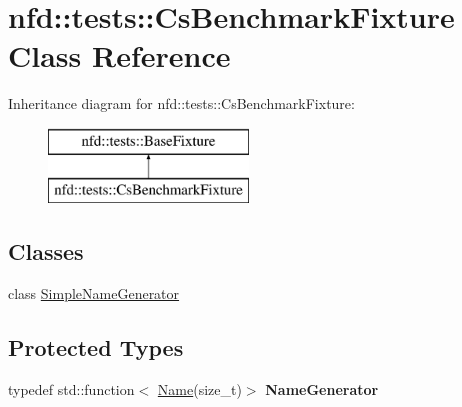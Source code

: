 \hypertarget{classnfd_1_1tests_1_1CsBenchmarkFixture}{}\section{nfd\+:\+:tests\+:\+:Cs\+Benchmark\+Fixture Class Reference}
\label{classnfd_1_1tests_1_1CsBenchmarkFixture}
Inheritance diagram for nfd\+:\+:tests\+:\+:Cs\+Benchmark\+Fixture\+:\begin{figure}[H]
\begin{center}
\leavevmode
\includegraphics[height=2.000000cm]{classnfd_1_1tests_1_1CsBenchmarkFixture}
\end{center}
\end{figure}
\subsection*{Classes}
\begin{DoxyCompactItemize}
\item 
class \hyperlink{classnfd_1_1tests_1_1CsBenchmarkFixture_1_1SimpleNameGenerator}{Simple\+Name\+Generator}
\end{DoxyCompactItemize}
\subsection*{Protected Types}
\begin{DoxyCompactItemize}
\item 
typedef std\+::function$<$ \hyperlink{classndn_1_1Name}{Name}(size\+\_\+t)$>$ {\bfseries Name\+Generator}\hypertarget{classnfd_1_1tests_1_1CsBenchmarkFixture_a0676b638e8150a905d5526db27e60240}{}\label{classnfd_1_1tests_1_1CsBenchmarkFixture_a0676b638e8150a905d5526db27e60240}

\end{DoxyCompactItemize}
